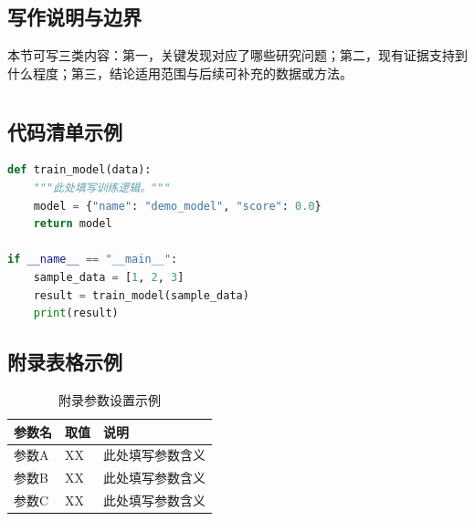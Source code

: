 \documentclass[UTF8,AutoFakeBold=1,AutoFakeSlant,zihao=-4]{SCAU}
\begin{document}
\subsection{写作说明与边界}
本节可写三类内容：第一，关键发现对应了哪些研究问题；第二，现有证据支持到什么程度；第三，结论适用范围与后续可补充的数据或方法。

\begin{references}
  
\end{references}

\appendix
\setcounter{tocdepth}{1}
\hypersetup{bookmarksdepth=1}

{}
\section*{\thesection}

\subsection*{代码清单示例}
\begin{lstlisting}[language=Python,caption={Python代码清单示例},label={lst:appendix_code}]
def train_model(data):
    """此处填写训练逻辑。"""
    model = {"name": "demo_model", "score": 0.0}
    return model

if __name__ == "__main__":
    sample_data = [1, 2, 3]
    result = train_model(sample_data)
    print(result)
\end{lstlisting}

\subsection*{附录表格示例}
\begin{table}[htbp]
  \centering
  \caption{附录参数设置示例}
  \label{tab:appendix_params}
  \begin{tabular}{lll}
    \toprule
    参数名 & 取值 & 说明 \\
    \midrule
    参数A & XX & 此处填写参数含义 \\
    参数B & XX & 此处填写参数含义 \\
    参数C & XX & 此处填写参数含义 \\
    \bottomrule
  \end{tabular}
\end{table}
\end{document}
